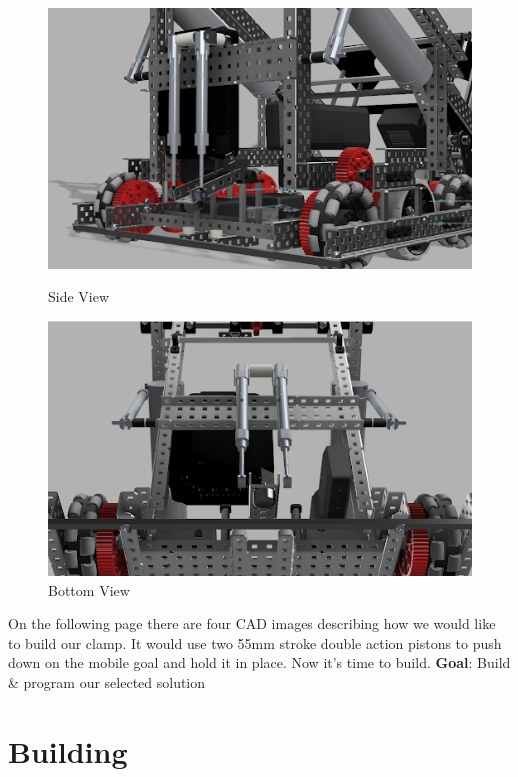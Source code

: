 \begin{figure}[h!]
\begin{minipage}{.55\textwidth}
        \includegraphics[width=1\linewidth]{images/Side-Clamp-V1.png}
        \caption{Side View}
        \label{fig:side}
    \end{minipage}
    \begin{minipage}{.55\textwidth}
        \centering
        \includegraphics[width=1\linewidth]{images/Bottom-Clamp-V1.png}
        \caption{Bottom View}
        \label{fig:bottom}
    \end{minipage}
\end{figure}

On the following page there are four CAD images describing how we would like to build our clamp. It would use two 55mm stroke double action pistons to push down on the mobile goal and hold it in place. Now it's time to build.
\label{Build-&-Program:-Clamp}
\textbf{Goal}: Build \& program our selected solution
\section*{Building}
